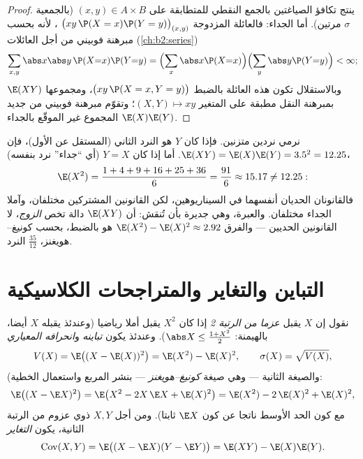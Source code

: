 \begin{proof}
ينتج تكافؤ الصياغتين بالجمع النقطي للمتطابقة على $(x, y) \in A \times B$ (بالجمعية
$\sigma$ مرتين). أما الجداء: فالعائلة المزدوجة $\bigl(xy\,\P(X = x)\P(Y = y)\bigr)_{(x,y)}$ ،
لأنه بحسب مبرهنة فوبيني من أجل العائلات (\cref{ch:b2:series})
\[
\sum_{x, y}\abs x \abs y\,\P(X{=}x)\P(Y{=}y)
= \Bigl(\sum_x \abs x \P(X{=}x)\Bigr)
\Bigl(\sum_y \abs y \P(Y{=}y)\Bigr) < \infty ;
\]
وبالاستقلال تكون هذه العائلة بالضبط $\bigl(xy\,\P(X = x, Y =
y)\bigr)$، ومجموعها $\E(XY)$ بمبرهنة
النقل مطبقة على المتغير $(X, Y) \mapsto xy$؛ وتقوّم مبرهنة فوبيني من جديد المجموع
غير الموقّع بالجداء $\E(X)\E(Y)$.
\end{proof}

\begin{example}\label{ex:b2:randomvar:productcontrast}
نرمي نردين متزنين. فإذا كان $Y$ هو النرد الثاني (المستقل عن
الأول)، فإن $\E(XY) = \E(X)\E(Y) = 3.5^2 = 12.25$. أما إذا كان $Y = X$ (أي ``جداء'' نرد بنفسه)،
\[
\E(X^2) = \frac{1 + 4 + 9 + 16 + 25 + 36}{6} = \frac{91}{6}
\approx 15.17 \neq 12.25 :
\]
فالقانونان الحديان أنفسهما في السيناريوهين، لكن القانونين المشتركين
مختلفان، وآملا الجداء مختلفان. والعبرة، وهي جديرة بأن تُنقش: أن
$\E(XY)$ دالة تخص \emph{الزوج}، لا القانونين الحديين --- والفرق $\E(X^2) - \E(X)^2 \approx 2.92$
هو بالضبط، بحسب كونيغ--هويغنز،  $\frac{35}{12}$ النرد.
\end{example}

\section{التباين والتغاير والمتراجحات الكلاسيكية}

\begin{definition}\label{def:b2:randomvar:variance}
نقول إن $X$ يقبل \emph{عزما من الرتبة 2} إذا كان $X^2$ يقبل
أملا رياضيا (وعندئذ يقبله $X$ أيضا، بالهيمنة: $\abs X \leq \frac{1 +
X^2}{2}$). وعندئذ
يكون \emph{تباينه} و\emph{انحرافه المعياري}
\[
V(X) = \E\bigl((X - \E(X))^2\bigr)
= \E(X^2) - \E(X)^2 ,
\qquad
\sigma(X) = \sqrt{V(X)} ,
\]
(والصيغة الثانية --- وهي صيغة \emph{كونيغ--هويغنز} --- بنشر المربع
واستعمال الخطية:
\[
\E\bigl((X - \E X)^2\bigr)
= \E\bigl(X^2 - 2X\,\E X + \E(X)^2\bigr)
= \E(X^2) - 2\,\E(X)^2 + \E(X)^2 ,
\]
مع كون الحد الأوسط ناتجا عن كون $\E X$ ثابتا). ومن أجل $X, Y$ ذوي
عزوم من الرتبة الثانية، يكون \emph{التغاير}
\[
\operatorname{Cov}(X, Y)
= \E\bigl((X - \E X)(Y - \E Y)\bigr)
= \E(XY) - \E(X)\E(Y) .
\]
\end{definition}

